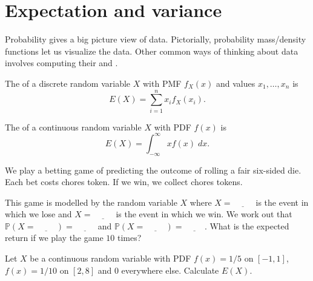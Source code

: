 \documentclass[../main.tex]{subfiles}
\begin{document}
 \section{Expectation and variance}

Probability gives a big picture view of data. Pictorially, probability mass/density functions let us visualize the data. Other common ways of thinking about data involves computing their  and . 

\begin{definition}[expectation]
  The  of a discrete random variable \(X\) with PMF \(f_{X}(x)\) and values \(x_{1}, \ldots, x_{n}\) is
  \begin{equation} \label{eq:expectation-discrete}
    E(X) = \sum_{i = 1}^{n} x_{i} f_{X}(x_{i}).
  \end{equation}

  The  of a continuous random variable \(X\) with PDF \(f(x)\) is
  \begin{equation} \label{eq:expectation-continuous}
    E(X) = \int_{-\infty}^{\infty} x f(x) \;dx.
  \end{equation}
\end{definition}

\begin{example} \label{ex:variance-discrete-betting}
  We play a betting game of predicting the outcome of rolling a fair six-sided die.  Each bet costs \underline{\hspace{1cm}} chores token. If we win, we collect \underline{\hspace{1cm}} chores tokens.

  This game is modelled by the random variable \(X\) where \(X = \underline{\hspace{1cm}}\) is the event in which we lose and \(X = \underline{\hspace{1cm}}\) is the event in which we win.  We work out that \(\mathbb{P}(X = \underline{\hspace{1cm}}) = \underline{\hspace{1cm}}\) and \(\mathbb{P}(X = \underline{\hspace{1cm}}) = \underline{\hspace{1cm}}\).  What is the expected return if we play the game \(10\) times?

\end{example}

\begin{example} \label{ex:variance-continuous-uniform}
  Let \(X\) be a continuous random variable with PDF \(f(x) = 1/5\) on \([-1, 1]\), \(f(x) = 1/10\) on \([2,8]\) and \(0\) everywhere else.  Calculate \(E(X)\).

\end{example}
\clearpage
\end{document}
